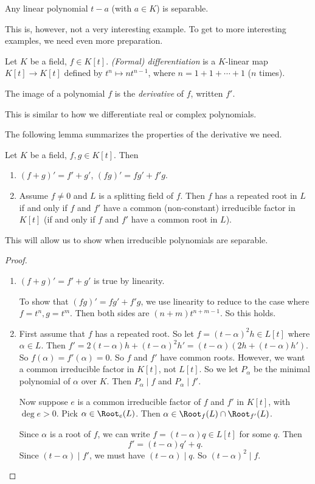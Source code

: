 \documentclass[a4paper]{article}
\begin{document}
\begin{eg}
  Any linear polynomial $t - a$ (with $a \in K$) is separable.
\end{eg}
This is, however, not a very interesting example. To get to more interesting examples, we need even more preparation.

\begin{defi}
  Let $K$ be a field, $f \in K[t]$. \emph{(Formal) differentiation} is a $K$-linear map $K[t] \to K[t]$ defined by $t^n \mapsto n t^{n - 1}$, where $n = 1 + 1 + \cdots + 1$ ($n$ times).

  The image of a polynomial $f$ is the \emph{derivative} of $f$, written $f'$.
\end{defi}
This is similar to how we differentiate real or complex polynomials.

The following lemma summarizes the properties of the derivative we need.
\begin{lemma}
  Let $K$ be a field, $f, g\in K[t]$. Then
  \begin{enumerate}
    \item $(f + g)' = f' + g'$, $(fg)' = fg' + f'g$.
    \item Assume $f \not= 0$ and $L$ is a splitting field of $f$. Then $f$ has a repeated root in $L$ if and only if $f$ and $f'$ have a common (non-constant) irreducible factor in $K[t]$ (if and only if $f$ and $f'$ have a common root in $L$).
  \end{enumerate}
\end{lemma}
This will allow us to show when irreducible polynomials are separable.

\begin{proof}\leavevmode
  \begin{enumerate}
    \item $(f + g)' = f' + g'$ is true by linearity.

      To show that $(fg)' = fg' + f'g$, we use linearity to reduce to the case where $f = t^n, g = t^m$. Then both sides are $(n + m) t^{n + m - 1}$. So this holds.
    \item First assume that $f$ has a repeated root. So let $f = (t - \alpha)^2 h \in L[t]$ where $\alpha \in L$. Then $f' = 2(t - \alpha)h + (t - \alpha)^2 h' = (t - \alpha)(2h + (t - \alpha)h')$. So $f(\alpha) = f'(\alpha) = 0$. So $f$ and $f'$ have common roots. However, we want a common irreducible factor in $K[t]$, not $L[t]$. So we let $P_\alpha$ be the minimal polynomial of $\alpha$ over $K$. Then $P_\alpha \mid f$ and $P_\alpha \mid f'$.

    Now suppose $e$ is a common irreducible factor of $f$ and $f'$ in $K[t]$, with $\deg e > 0$. Pick $\alpha \in \Root_e(L)$. Then $\alpha \in \Root_f(L) \cap \Root_{f'}(L)$.

      Since $\alpha$ is a root of $f$, we can write $f = (t - \alpha)q \in L[t]$ for some $q$. Then
      \[
        f' = (t - \alpha) q' + q.
      \]
      Since $(t - \alpha) \mid f'$, we must have $(t - \alpha) \mid q$. So $(t - \alpha)^2 \mid f$.
  \end{enumerate}
\end{proof}
\end{document}
